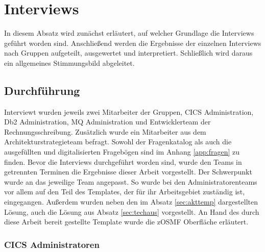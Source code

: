 \section{Interviews}
In diesem Absatz wird zunächst erläutert, auf welcher Grundlage die Interviews geführt worden sind.
Anschließend werden die Ergebnisse der einzelnen Interviews nach Gruppen aufgeteilt, ausgewertet und interpretiert.
Schließlich wird daraus ein allgemeines Stimmungsbild abgeleitet.

\subsection{Durchführung}
Interviewt wurden jeweils zwei Mitarbeiter der Gruppen, CICS Administration, Db2 Administration, MQ Administration und Entwicklerteam der Rechnungsschreibung.
Zusätzlich wurde ein Mitarbeiter aus dem Architekturstrategieteam befragt.
Sowohl der Fragenkatalog als auch die ausgefüllten und digitalisierten Fragebögen sind im Anhang \ref{app:fragen} zu finden.
Bevor die Interviews durchgeführt worden sind, wurde den Teams in getrennten Terminen die Ergebnisse dieser Arbeit vorgestellt.
Der Schwerpunkt wurde an das jeweilige Team angepasst.
So wurde bei den Administratorenteams vor allem auf den Teil des Templates, der für ihr Arbeitsgebiet zuständig ist, eingegangen.
Außerdem wurden neben den im Absatz \ref{sec:akttemp} dargestellten Lösung, auch die Lösung aus Absatz \ref{sec:techaus} vorgestellt.
An Hand des durch diese Arbeit bereit gestellte Template wurde die zOSMF Oberfläche erläutert.

\subsubsection{CICS Administratoren}
